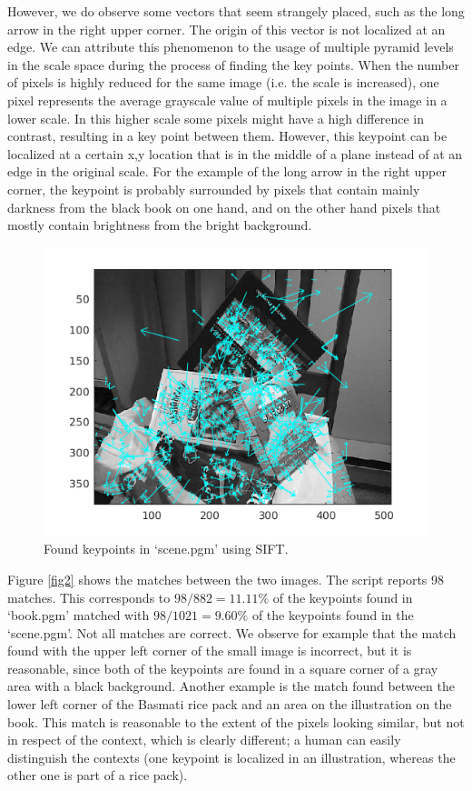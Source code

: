 \documentclass{article}
\begin{document}
However, we do observe some vectors that seem strangely placed, such as the long arrow in the right upper corner. The origin of this vector is not localized at an edge. We can attribute this phenomenon to the usage of multiple pyramid levels in the scale space during the process of finding the key points. When the number of pixels is highly reduced for the same image (i.e. the scale is increased), one pixel represents the average grayscale value of multiple pixels in the image in a lower scale. In this higher scale some pixels might have a high difference in contrast, resulting in a key point between them. However, this keypoint can be localized at a certain x,y location that is in the middle of a plane instead of at an edge in the original scale. For the example of the long arrow in the right upper corner, the keypoint is probably surrounded by pixels that contain mainly darkness from the black book on one hand, and on the other hand pixels that mostly contain brightness from the bright background. 
\begin{figure}[H]
 \centering
 \includegraphics[width=.7\textwidth]{keypoints.png}
 \caption{Found keypoints in `scene.pgm' using SIFT.}
 \label{fig1}
\end{figure}

Figure \ref{fig2} shows the matches between the two images. The script reports 98 matches. This corresponds to $98/882 = 11.11\%$ of the keypoints found in `book.pgm' matched with $98/1021 = 9.60\%$ of the keypoints found in the `scene.pgm'. Not all matches are correct. We observe for example that the match found with the upper left corner of the small image is incorrect, but it is reasonable, since both of the keypoints are found in a square corner of a gray area with a black background. Another example is the match found between the lower left corner of the Basmati rice pack and an area on the illustration on the book. This match is reasonable to the extent of the pixels looking similar, but not in respect of the context, which is clearly different; a human can easily distinguish the contexts (one keypoint is localized in an illustration, whereas the other one is part of a rice pack).
\end{document}
